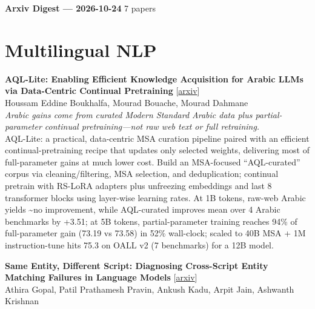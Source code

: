 \documentclass[12pt,letterpaper]{article}
\begin{document}
{\footnotesize\textbf{Arxiv Digest --- 2026-10-24} \hfill 7 papers}

\smallskip

\section*{Multilingual NLP}

{\small\textbf{AQL-Lite: Enabling Efficient Knowledge Acquisition for Arabic LLMs via Data-Centric Continual Pretraining}} {\scriptsize[\href{https://arxiv.org/abs/2610.30344}{arxiv}]}\\
{\scriptsize Houssam Eddine Boukhalfa, Mourad Bouache, Mourad Dahmane}\\

{\small\textit{Arabic gains come from curated Modern Standard Arabic data plus partial-parameter continual pretraining---not raw web text or full retraining.}}\\[1pt]
{\footnotesize AQL-Lite: a practical, data-centric MSA curation pipeline paired with an efficient continual-pretraining recipe that updates only selected weights, delivering most of full-parameter gains at much lower cost. Build an MSA-focused ``AQL-curated'' corpus via cleaning/filtering, MSA selection, and deduplication; continual pretrain with RS-LoRA adapters plus unfreezing embeddings and last 8 transformer blocks using layer-wise learning rates. At 1B tokens, raw-web Arabic yields \textasciitilde{}no improvement, while AQL-curated improves mean over 4 Arabic benchmarks by +3.51; at 5B tokens, partial-parameter training reaches 94\% of full-parameter gain (73.19 vs 73.58) in 52\% wall-clock; scaled to 40B MSA + 1M instruction-tune hits 75.3 on OALL v2 (7 benchmarks) for a 12B model.}

\medskip

{\small\textbf{Same Entity, Different Script: Diagnosing Cross-Script Entity Matching Failures in Language Models}} {\scriptsize[\href{https://arxiv.org/abs/2610.31407}{arxiv}]}\\
{\scriptsize Athira Gopal, Patil Prathamesh Pravin, Ankush Kadu, Arpit Jain, Ashwanth Krishnan}\\
\end{document}

